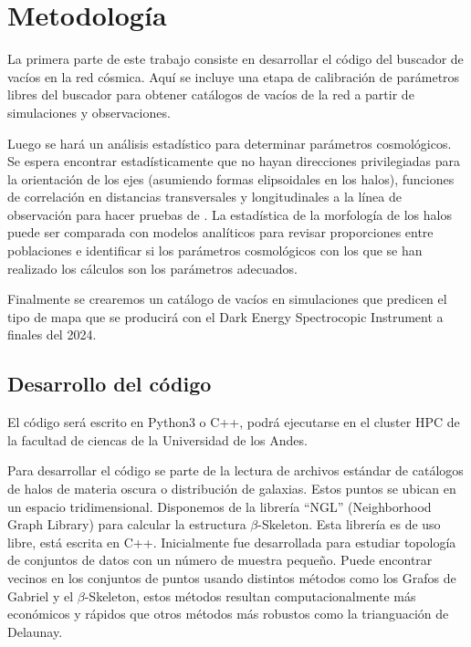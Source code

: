 \documentclass[preprint]{aastex62}
\begin{document}
  \section{Metodología}

  La primera parte de este trabajo consiste en desarrollar el código del buscador de vacíos
  en la red cósmica. Aquí se incluye una etapa de calibración de parámetros libres del buscador
  para obtener catálogos de vacíos de la red a partir de simulaciones y observaciones.
   
  Luego se hará un análisis estadístico para determinar parámetros cosmológicos.
  Se espera encontrar estadísticamente que no hayan direcciones privilegiadas para la orientación
  de los ejes (asumiendo formas elipsoidales en los halos), funciones de correlación en distancias
  transversales y longitudinales a la línea de observación para hacer pruebas de
  \citet{AlcockPaczynski1979}. La estadística de la morfología de los halos puede ser comparada
  con modelos analíticos para revisar proporciones entre poblaciones e identificar si los
  parámetros cosmológicos con los que se han realizado los cálculos son los parámetros adecuados.
  
  Finalmente se crearemos un cat\'alogo de vac\'ios en simulaciones
  que predicen el tipo de mapa que se producir\'a con el Dark Energy
  Spectrocopic Instrument a finales del 2024. 

  \subsection{Desarrollo del código}

  El código será escrito en Python3 o C++, podrá ejecutarse en el
  cluster HPC de la facultad de ciencas de la Universidad de los Andes.
  
  Para desarrollar el código se parte de la lectura de archivos estándar de catálogos de halos
  de materia oscura o distribución de galaxias. Estos puntos se ubican en un espacio tridimensional.
  Disponemos de la librería ``NGL''\citep{ngl} (Neighborhood Graph Library)
  para calcular la estructura $\beta$-Skeleton. Esta librería es de uso libre, está escrita en C++.
  Inicialmente fue desarrollada para estudiar topología de conjuntos de datos con un número de muestra
  pequeño. Puede encontrar vecinos en los conjuntos de puntos usando distintos métodos como los
  Grafos de Gabriel y el $\beta$-Skeleton, estos métodos resultan computacionalmente más económicos
  y rápidos que otros métodos más robustos como la trianguación de Delaunay.
  
\end{document}
